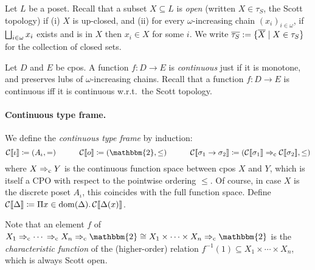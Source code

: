 Let $L$ be a poset. 
Recall that a subset $X \subseteq L$ is \emph{open} (written $X \in \tau_S$, the Scott topology) if (i) $X$ is up-closed, and (ii) for every $\omega$-increasing chain $(x_i)_{i \in \omega}$, if $\bigsqcup_{i \in \omega} x_i$ exists and is in $X$ then $x_i \in X$ for some $i$. 
We write $\overline{\tau_S} := \{\overline X \mid X \in \tau_S\}$ for the collection of closed sets.


Let $D$ and $E$ be cpos. 
A function $f:D \to E$ is \emph{continuous} just if it is monotone, and preserves lubs of $\omega$-increasing chains.
Recall that a function $f : D \to E$ is continuous iff it is continuous w.r.t.~the Scott topology.

\paragraph{Continuous type frame.}
We define the \emph{continuous type frame} by induction:
\[
   \cmng{\iota} \coloneqq (A_\iota, =)
   \qquad\quad \cmng{\boolsort} \coloneqq (\mathbbm{2}, \leq)
   \qquad\quad \cmng{\sigma_1 \to \sigma_2} \coloneqq (\cmng{\sigma_1} \cTo \cmng{\sigma_2}, \leq)
\]
where $X \Rightarrow_{\rm c} Y$ is the continuous function space between cpos $X$ and $Y$, which is itself a CPO with respect to the pointwise ordering $\leq$.
Of course, in case $X$ is the discrete poset $A_\iota$, this coincides with the full function space.
Define $\mathcal{C}\llbracket \Delta \rrbracket \coloneqq \Pi x \in \mathrm{dom}(\Delta).\,\mathcal{C}\llbracket \Delta(x) \rrbracket$.

Note that an element $f$ of $X_1 \cTo \cdots{} \cTo X_n \cTo \mathbbm{2} \cong X_1 \times \cdots \times X_n \cTo \mathbbm{2}$ is the \emph{characteristic function} of the (higher-order) relation $f^{-1}(1) \subseteq X_1 \times \cdots \times X_n$, which is always Scott open.


